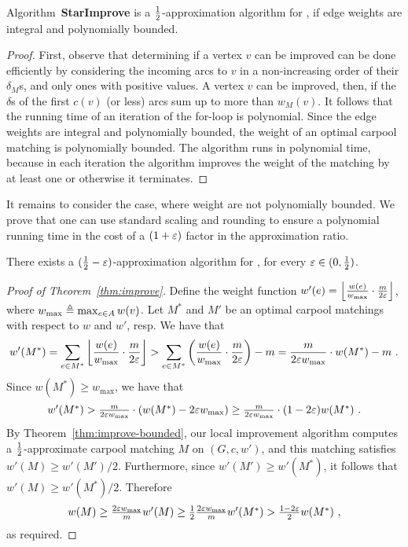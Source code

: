 \begin{theorem}
\label{thm:improve-bounded}
Algorithm~\textbf{StarImprove} is a $\frac{1}{2}$-approximation algorithm
for \carpool, if edge weights are integral and polynomially bounded.
\end{theorem}
\begin{proof}
First, observe that determining if a vertex $v$ can be improved can be
done efficiently by considering the incoming arcs to $v$ in a
non-increasing order of their $\delta_M$s, and only ones with positive
values.  A vertex $v$ can be improved, then, if the $\delta$s of the
first $c(v)$ (or less) arcs sum up to more than $w_M(v)$.
%
It follows that the running time of an iteration of the for-loop is
polynomial.  Since the edge weights are integral and polynomially
bounded, the weight of an optimal carpool matching is polynomially
bounded.  The algorithm runs in polynomial time, because in each
iteration the algorithm improves the weight of the matching by at
least one or otherwise it terminates.
\end{proof}

It remains to consider the case, where weight are not polynomially
bounded. 
We prove that one can use
standard scaling and rounding to ensure a polynomial running time in
the cost of a $(1+\varepsilon)$ factor in the approximation ratio.

\begin{theorem}
\label{thm:improve}
There exists a $(\frac{1}{2}-\varepsilon)$-approximation algorithm for \carpool,
for every $\varepsilon \in (0,\frac{1}{2})$.
\end{theorem}

\begin{proof}[Proof of Theorem~\ref{thm:improve}]
Define the weight function $w'(e)
= \left\lfloor \frac{w(e)}{w_{\max}} \cdot \frac{m}{2\varepsilon} \right\rfloor$, where
$w_{\max} \triangleq \max_{e \in A} w(v)$.
%
Let $M^*$ and $M'$ be an optimal carpool matchings with respect to $w$
and $w'$, resp.  We have that
\[
w'(M^*)
=    \sum_{e \in M^*} \left\lfloor \frac{w(e)}{w_{\max}} \cdot \frac{m}{2\varepsilon} \right\rfloor
>    \sum_{e \in M^*} \left(  \frac{w(e)}{w_{\max}} \cdot \frac{m}{2\varepsilon}  \right) - m
=    \frac{m}{2\varepsilon w_{\max}} \cdot w(M^*) - m
~.
\]
Since $w(M^*) \geq w_{\max}$, we have that 
\[
\textstyle
w'(M^*)
>    \frac{m}{2\varepsilon w_{\max}} \cdot (w(M^*) - 2\varepsilon w_{\max})
\geq \frac{m}{2\varepsilon w_{\max}} \cdot (1 - 2\varepsilon) w(M^*)
~.
\]
By Theorem~\ref{thm:improve-bounded}, our local improvement algorithm computes a
$\frac{1}{2}$-approximate carpool matching $M$ on $(G, c, w')$, and this
matching satisfies $w'(M) \geq w'(M')/2$.  Furthermore, since
$w'(M') \geq w'(M^*)$, it follows that $w'(M) \geq w'(M^*)/2$.
Therefore
\[
\textstyle
w(M)
\geq \frac{2\varepsilon w_{\max}}{m} w'(M) 
\geq \frac{1}{2} \frac{2\varepsilon w_{\max}}{m} w'(M^*)
>    \frac{1-2\varepsilon}{2} w(M^*)
~,
\]
as required.
\end{proof}
